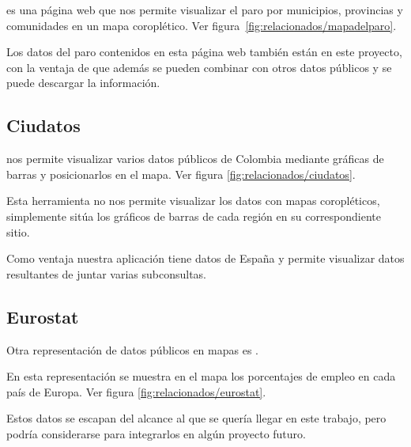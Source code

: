 es una página web que nos permite visualizar el paro por municipios, provincias y comunidades en un mapa coroplético. Ver figura~\ref{fig:relacionados/mapadelparo}.

Los datos del paro contenidos en esta página web también están en este proyecto, con la ventaja de que además se pueden combinar con otros datos públicos y se puede descargar la información.


\subsection{Ciudatos}

 nos permite visualizar varios datos públicos de Colombia mediante gráficas de barras y posicionarlos en el mapa. Ver figura \ref{fig:relacionados/ciudatos}.

Esta herramienta no nos permite visualizar los datos con mapas coropléticos, simplemente sitúa los gráficos de barras de cada región en su correspondiente sitio.

Como ventaja nuestra aplicación tiene datos de España y permite visualizar datos resultantes de juntar varias subconsultas.


\subsection{Eurostat}

Otra representación de datos públicos en mapas es .

En esta representación se muestra en el mapa los porcentajes de empleo en cada país de Europa. Ver figura \ref{fig:relacionados/eurostat}.

Estos datos se escapan del alcance al que se quería llegar en este trabajo, pero podría considerarse para integrarlos en algún proyecto futuro.

